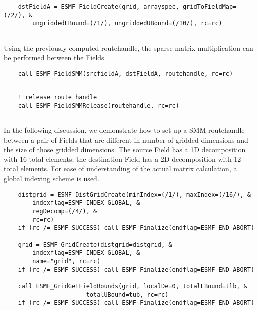 
 \begin{verbatim}
    dstFieldA = ESMF_FieldCreate(grid, arrayspec, gridToFieldMap=(/2/), &
        ungriddedLBound=(/1/), ungriddedUBound=(/10/), rc=rc)
 
\end{verbatim}
 

   Using the previously computed routehandle, the sparse matrix multiplication
   can be performed between the Fields. 

 \begin{verbatim}
    call ESMF_FieldSMM(srcfieldA, dstFieldA, routehandle, rc=rc)
 
\end{verbatim}
 

 \begin{verbatim}
    ! release route handle
    call ESMF_FieldSMMRelease(routehandle, rc=rc)
 
\end{verbatim}
 

   In the following discussion, we demonstrate how to set up a SMM routehandle
   between a pair of Fields that are different in number of gridded dimensions
   and the size of those gridded dimensions. The source Field has a 1D decomposition
   with 16 total elements; the destination Field has a 2D decomposition with
   12 total elements. For ease of understanding of the actual matrix calculation,
   a global indexing scheme is used. 

 \begin{verbatim}
    distgrid = ESMF_DistGridCreate(minIndex=(/1/), maxIndex=(/16/), &
        indexflag=ESMF_INDEX_GLOBAL, &
        regDecomp=(/4/), &
        rc=rc)
    if (rc /= ESMF_SUCCESS) call ESMF_Finalize(endflag=ESMF_END_ABORT)

    grid = ESMF_GridCreate(distgrid=distgrid, &
        indexflag=ESMF_INDEX_GLOBAL, &
        name="grid", rc=rc)
    if (rc /= ESMF_SUCCESS) call ESMF_Finalize(endflag=ESMF_END_ABORT)

    call ESMF_GridGetFieldBounds(grid, localDe=0, totalLBound=tlb, &
                       totalUBound=tub, rc=rc)
    if (rc /= ESMF_SUCCESS) call ESMF_Finalize(endflag=ESMF_END_ABORT)
 
\end{verbatim}
 
